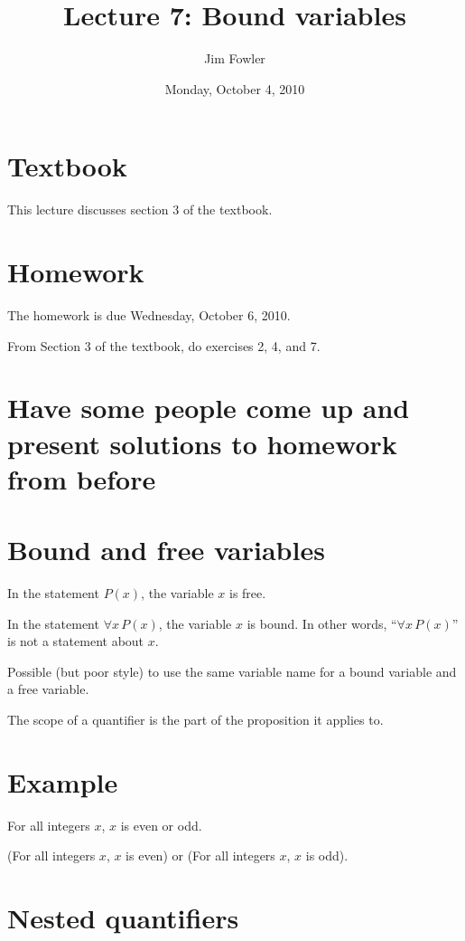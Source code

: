 \documentclass[12pt]{handout}
\title{Lecture 7: Bound variables}
\author{Jim Fowler}
\date{Monday, October  4, 2010}
\begin{document}
\maketitle

\section*{Textbook}

This lecture discusses section 3 of the textbook.

\section*{Homework} 

The homework is due Wednesday, October  6, 2010.

From Section 3 of the textbook, do exercises 2, 4, and 7.

\section*{Have some people come up and present solutions to homework from before}

\section*{Bound and free variables}

In the statement $P(x)$, the variable $x$ is free.

In the statement $\forall x \, P(x)$, the variable $x$ is bound.  In other words, ``$\forall x \, P(x)$'' is not a statement about $x$.

Possible (but poor style) to use the same variable name for a bound variable and a free variable.

The scope of a quantifier is the part of the proposition it applies to.

\section*{Example}

For all integers $x$, $x$ is even or odd.

(For all integers $x$, $x$ is even) or (For all integers $x$, $x$ is odd).

\section*{Nested quantifiers}
\end{document}
